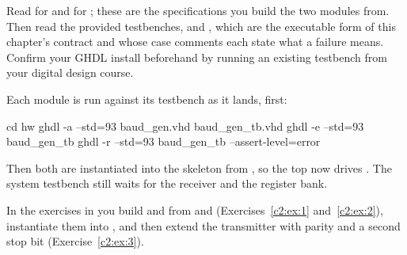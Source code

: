 Read  for  and  for ;
these are the specifications you build the two modules from. Then read the provided testbenches,
 and , which are the executable form of this
chapter's contract and whose case comments each state what a failure means. Confirm your GHDL
install beforehand by running an existing testbench from your digital design course.

Each module is run against its testbench as it lands,  first:

\begin{shell}
cd hw
ghdl -a --std=93 baud_gen.vhd baud_gen_tb.vhd
ghdl -e --std=93 baud_gen_tb
ghdl -r --std=93 baud_gen_tb --assert-level=error
\end{shell}

\noindent Then both are instantiated into the  skeleton from , so the top
now drives . The system testbench still waits for the receiver and the register bank.

In the exercises in  you build  and  from
 and  (Exercises~\ref{c2:ex:1} and~\ref{c2:ex:2}),
instantiate them into , and then extend the transmitter with parity and a second
stop bit (Exercise~\ref{c2:ex:3}).





